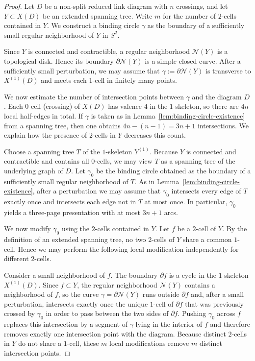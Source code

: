 \documentclass[10pt,a4paper]{amsart}
\begin{document}
\begin{proof}
Let $D$ be a non-split reduced link diagram with $n$ crossings, and let $Y \subset X(D)$ be an extended spanning tree.
Write $m$ for the number of $2$-cells contained in $Y$.
We construct a binding circle $\gamma$ as the boundary of a sufficiently small regular neighborhood of $Y$ in $S^2$.

Since $Y$ is connected and contractible, a regular neighborhood $\mathcal{N}(Y)$ is a topological disk.
Hence its boundary $\partial \mathcal{N}(Y)$ is a simple closed curve.
After a sufficiently small perturbation, we may assume that $\gamma:=\partial \mathcal{N}(Y)$ is transverse to $X^{(1)}(D)$ and meets each $1$-cell in finitely many points.

We now estimate the number of intersection points between $\gamma$ and the diagram $D$.
Each $0$-cell (crossing) of $X(D)$ has valence $4$ in the $1$-skeleton, so there are $4n$ local half-edges in total.
If $\gamma$ is taken as in Lemma~\ref{lem:binding-circle-existence} from a spanning tree, then one obtains $4n-(n-1)=3n+1$ intersections.
We explain how the presence of $2$-cells in $Y$ decreases this count.

Choose a spanning tree $T$ of the $1$-skeleton $Y^{(1)}$.
Because $Y$ is connected and contractible and contains all $0$-cells, we may view $T$ as a spanning tree of the underlying graph of $D$.
Let $\gamma_0$ be the binding circle obtained as the boundary of a sufficiently small regular neighborhood of $T$.
As in Lemma~\ref{lem:binding-circle-existence}, after a perturbation we may assume that $\gamma_0$ intersects every edge of $T$ exactly once and intersects each edge not in $T$ at most once.
In particular, $\gamma_0$ yields a three-page presentation with at most $3n+1$ arcs.

We now modify $\gamma_0$ using the $2$-cells contained in $Y$.
Let $f$ be a $2$-cell of $Y$.
By the definition of an extended spanning tree, no two $2$-cells of $Y$ share a common $1$-cell.
Hence we may perform the following local modification independently for different $2$-cells.

Consider a small neighborhood of $f$.
The boundary $\partial f$ is a cycle in the $1$-skeleton $X^{(1)}(D)$.
Since $f \subset Y$, the regular neighborhood $\mathcal{N}(Y)$ contains a neighborhood of $f$,
so the curve $\gamma=\partial \mathcal{N}(Y)$ runs outside $\partial f$ and, after a small perturbation, intersects exactly once the unique $1$-cell of $\partial f$ that was previously crossed by $\gamma_0$ in order to pass between the two sides of $\partial f$.
Pushing $\gamma_0$ across $f$ replaces this intersection by a segment of $\gamma$ lying in the interior of $f$ and therefore removes exactly one intersection point with the diagram.
Because distinct $2$-cells in $Y$ do not share a $1$-cell, these $m$ local modifications remove $m$ distinct intersection points.


\end{proof}
\end{document}
